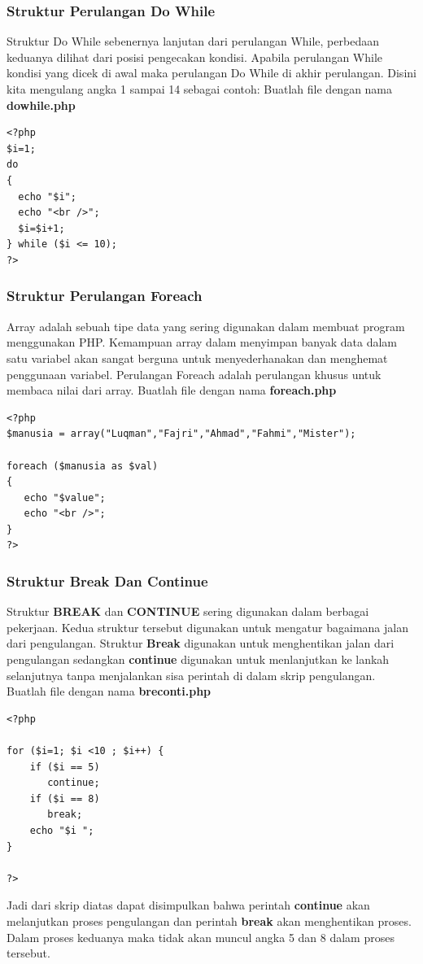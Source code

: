 \subsubsection{Struktur Perulangan Do While}
Struktur Do While sebenernya lanjutan dari perulangan While, perbedaan keduanya dilihat dari posisi pengecakan kondisi. Apabila perulangan While kondisi yang dicek di awal maka perulangan Do While di akhir perulangan. Disini kita mengulang angka  1 sampai 14 sebagai contoh:  Buatlah file dengan nama \textbf{dowhile.php}
\begin{lstlisting}
<?php
$i=1;
do
{
  echo "$i";
  echo "<br />";
  $i=$i+1;
} while ($i <= 10);
?>
\end{lstlisting}

\subsubsection{Struktur Perulangan Foreach}
Array adalah sebuah tipe data yang sering digunakan dalam membuat program menggunakan PHP. Kemampuan array dalam menyimpan banyak data dalam satu variabel akan sangat berguna untuk menyederhanakan dan menghemat penggunaan variabel. Perulangan Foreach adalah perulangan khusus untuk membaca nilai dari array. Buatlah file dengan nama \textbf{foreach.php}
\begin{lstlisting}
<?php
$manusia = array("Luqman","Fajri","Ahmad","Fahmi","Mister");

foreach ($manusia as $val)
{
   echo "$value";
   echo "<br />";
}
?>
\end{lstlisting}

\subsubsection{Struktur Break Dan Continue}
Struktur \textbf{BREAK} dan \textbf{CONTINUE} sering digunakan dalam berbagai pekerjaan. Kedua struktur tersebut digunakan untuk mengatur bagaimana jalan dari pengulangan. Struktur \textbf{Break} digunakan untuk menghentikan jalan dari pengulangan sedangkan \textbf{continue} digunakan untuk menlanjutkan ke lankah selanjutnya tanpa menjalankan sisa perintah di dalam skrip pengulangan. Buatlah file dengan nama \textbf{breconti.php}
\begin{lstlisting}
<?php
 
for ($i=1; $i <10 ; $i++) {
    if ($i == 5)
       continue;
    if ($i == 8)
       break;
    echo "$i ";
}
 
?>
\end{lstlisting}
Jadi dari skrip diatas dapat disimpulkan bahwa perintah  \textbf{continue} akan melanjutkan proses pengulangan dan perintah \textbf{break} akan menghentikan proses. Dalam proses keduanya maka tidak akan muncul angka 5 dan 8 dalam proses tersebut.


